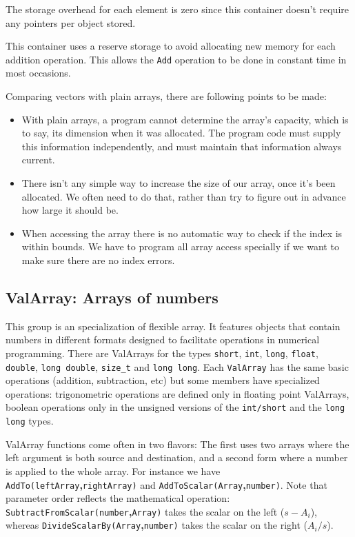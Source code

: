\documentclass[12pt,a4paper,openany]{memoir} %
\begin{document}
The storage overhead for each element is zero since this container doesn't require any pointers per object stored.

This container uses a reserve storage to avoid allocating new memory for each addition operation. This allows the \verb,Add, operation to be done in constant time in most occasions.

Comparing vectors with plain arrays, there are following points to be made:
\begin{itemize}
\item With plain arrays, a program cannot determine the array's capacity, which is to say, its dimension when it was allocated.  
The program code must supply this information independently, and must maintain that information always current.

\item There isn't any simple way to increase the size of our array, once it’s been allocated.  We often need to do that, rather than try to figure out 
in advance how large it should be.

\item When accessing the array there is no automatic way to check if the index is within bounds. We have to program all array access specially
if we want to make sure there are no index errors.

\end{itemize}

\subsection{ValArray: Arrays of numbers}
This group is an specialization of flexible array. It features objects that contain numbers in different formats designed to facilitate operations
in numerical programming. There are ValArrays for the types \texttt{short}, \texttt{int}, \texttt{long}, \texttt{float}, \texttt{double},
\texttt{long double}, \texttt{size\_t} and \texttt{long long}. Each \texttt{ValArray} has the same basic operations (addition, subtraction, etc)
but some members have specialized operations: trigonometric operations are defined only in floating point ValArrays, boolean operations only in the unsigned versions of the \texttt{int/short} and the \texttt{long long} types.

ValArray functions come often in two flavors: The first uses two arrays where the left argument is both source and destination, and a second form where
a number is applied to the whole array. For instance we have \verb,AddTo(leftArray,\textbf{,}\verb,rightArray), and \verb,AddToScalar(Array,\textbf{,}\verb,number),. Note that parameter order reflects the mathematical operation: \verb,SubtractFromScalar(number,\textbf{,}\verb,Array), takes the scalar on the left ($s - A_i$), whereas \verb,DivideScalarBy(Array,\textbf{,}\verb,number), takes the scalar on the right ($A_i / s$).
\end{document}
